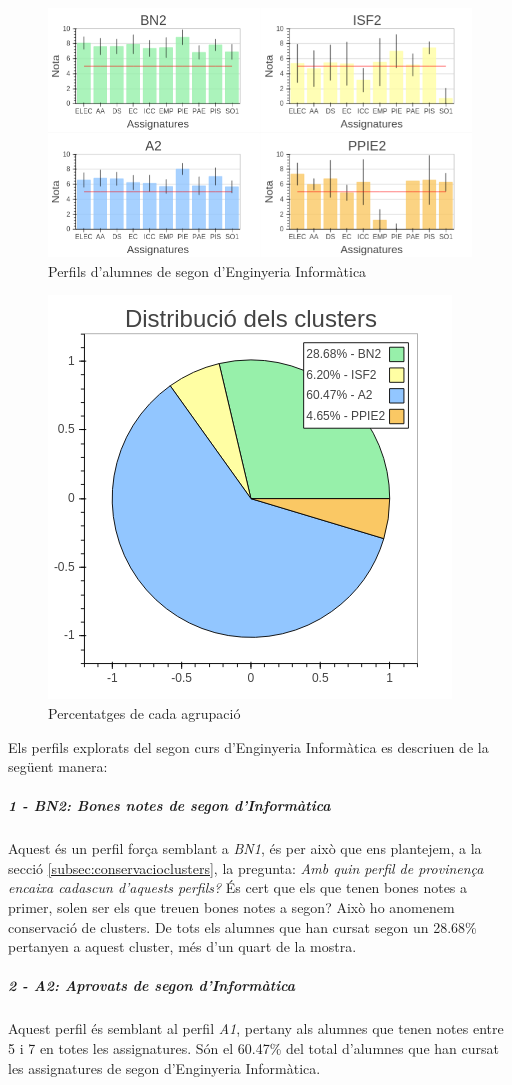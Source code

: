 \documentclass[12pt,a4paper,catalan]{article}
\begin{document}
\begin{figure}[h]
\centering
\includegraphics[width=.8\linewidth]{img/perfils_segon_info.png}
\caption{Perfils d'alumnes de segon d'Enginyeria Informàtica}
\label{fig:perfilssegoninfo}
\end{figure}

\begin{figure}[h]
\centering
\includegraphics[width=.4\linewidth]{img/perfils_segon_info_pastilla.png}
\caption{Percentatges de cada agrupació}
\end{figure}


Els perfils explorats del segon curs d'Enginyeria Informàtica es descriuen de la següent manera:

\subparagraph{1 - BN2: Bones notes de segon d'Informàtica}
Aquest és un perfil força semblant a \textit{BN1}, és per això que ens plantejem, a la secció \ref{subsec:conservacioclusters}, la pregunta: \textit{Amb quin perfil de provinença encaixa cadascun d'aquests perfils?} És cert que els que tenen bones notes a primer, solen ser els que treuen bones notes a segon? Això ho anomenem conservació de clusters. De tots els alumnes que han cursat segon un 28.68\% pertanyen a aquest cluster, més d'un quart de la mostra.

\subparagraph{2 - A2: Aprovats de segon d'Informàtica}
Aquest perfil és semblant al perfil \textit{A1}, pertany als alumnes que tenen notes entre 5 i 7 en totes les assignatures. Són el 60.47\% del total d'alumnes que han cursat les assignatures de segon d'Enginyeria Informàtica.
\end{document}
